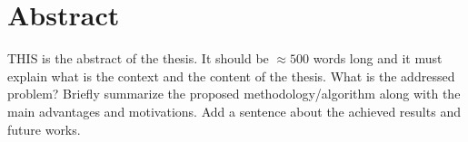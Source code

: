 \chapter{Abstract}
\label{Abstract}
\thispagestyle{empty}

THIS is the abstract of the thesis. It should be $\approx 500$ words long and it must explain what is the context and the content of the thesis. What is the addressed problem? Briefly summarize the proposed methodology/algorithm along with the main advantages and motivations.
Add a sentence about the achieved results and future works.